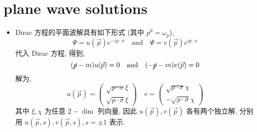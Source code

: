 \section{plane wave solutions}
\begin{itemize}
	\item Dirac 方程的平面波解具有如下形式 (其中 $p^0 = \omega_p$),
	\begin{equation}
		\Psi = u(\vec{p}) e^{- i p \cdot x} \quad \text{and} \quad \Psi = v(\vec{p}) e^{i p \cdot x}
	\end{equation}
	代入 Dirac 方程, 得到,
	\begin{equation}
		(\cancel{p} - m) u(\vec{p}) = 0 \quad \text{and} \quad (- \cancel{p} - m) v(\vec{p}) = 0
	\end{equation}
	解为,
	\begin{equation}
		u(\vec{p}) = \begin{pmatrix}
			\sqrt{p \cdot \sigma} \xi \\
			\sqrt{p \cdot \bar{\sigma}} \xi
		\end{pmatrix} \quad v = \begin{pmatrix}
			\sqrt{p \cdot \sigma} \chi \\
			- \sqrt{p \cdot \bar{\sigma}} \chi
		\end{pmatrix}
	\end{equation}
	其中 $\xi, \chi$ 为任意 $2-\dim$ 列向量, 因此 $u(\vec{p}), v(\vec{p})$ 各有两个独立解, 分别用 $u(\vec{p}, s), v(\vec{p}, s), s = \pm 1$ 表示.
	

\end{itemize}
